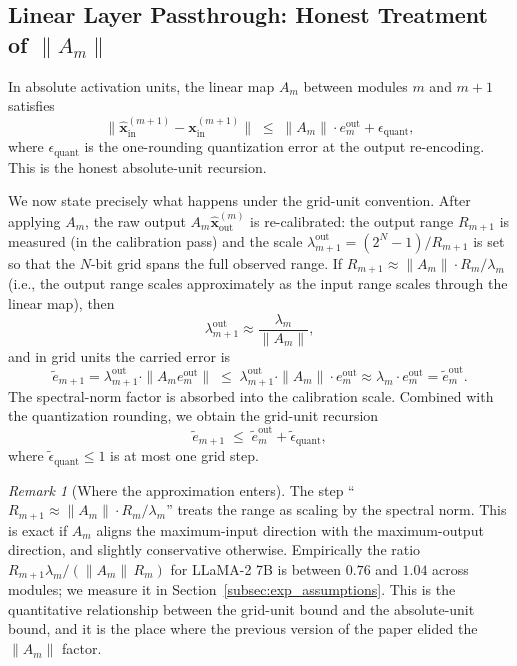 \documentclass{article}
\theoremstyle{plain}
\theoremstyle{definition}
\theoremstyle{remark}
\newtheorem{remark}[theorem]{Remark}
\begin{document}
\subsection{Linear Layer Passthrough: Honest Treatment of $\|A_m\|$}
\label{app:linear_passthrough_honest}

In absolute activation units, the linear map $A_m$ between modules $m$ and
$m+1$ satisfies
\begin{equation}
\label{eq:linear_passthrough_abs}
\|\hat{\mathbf{x}}^{(m+1)}_\mathrm{in} - \mathbf{x}^{(m+1)}_\mathrm{in}\|
\;\le\; \|A_m\| \cdot e_m^\mathrm{out} + \epsilon_\mathrm{quant},
\end{equation}
where $\epsilon_\mathrm{quant}$ is the one-rounding quantization error at the
output re-encoding. This is the honest absolute-unit recursion.

We now state precisely what happens under the grid-unit convention. After
applying $A_m$, the raw output $A_m \hat{\mathbf{x}}^{(m)}_\mathrm{out}$ is
re-calibrated: the output range $R_{m+1}$ is measured (in the calibration
pass) and the scale $\lambda_{m+1}^{\mathrm{out}} = (2^N-1)/R_{m+1}$ is set so
that the $N$-bit grid spans the full observed range. If $R_{m+1} \approx
\|A_m\| \cdot R_m / \lambda_m$ (i.e., the output range scales approximately
as the input range scales through the linear map), then
\[
\lambda_{m+1}^{\mathrm{out}} \approx \frac{\lambda_m}{\|A_m\|},
\]
and in grid units the carried error is
\[
\tilde{e}_{m+1}
= \lambda_{m+1}^{\mathrm{out}} \cdot \|A_m e_m^\mathrm{out}\|
\;\le\; \lambda_{m+1}^{\mathrm{out}} \cdot \|A_m\| \cdot e_m^\mathrm{out}
\approx \lambda_m \cdot e_m^\mathrm{out}
= \tilde e_m^\mathrm{out}.
\]
The spectral-norm factor is absorbed into the calibration scale.
Combined with the quantization rounding, we obtain the grid-unit recursion
\begin{equation}
\label{eq:linear_passthrough_grid}
\tilde{e}_{m+1} \;\le\; \tilde{e}_m^\mathrm{out} + \tilde\epsilon_\mathrm{quant},
\end{equation}
where $\tilde\epsilon_\mathrm{quant} \le 1$ is at most one grid step.

\begin{remark}[Where the approximation enters]
\label{rem:abs_approx}
The step ``$R_{m+1} \approx \|A_m\| \cdot R_m / \lambda_m$'' treats the range
as scaling by the spectral norm. This is exact if $A_m$ aligns the
maximum-input direction with the maximum-output direction, and slightly
conservative otherwise. Empirically the ratio
$R_{m+1}\lambda_m / (\|A_m\|\,R_m)$ for LLaMA-2 7B is between $0.76$ and
$1.04$ across modules; we measure it in Section~\ref{subsec:exp_assumptions}.
This is the quantitative relationship between the grid-unit bound and the
absolute-unit bound, and it is the place where the previous version of the
paper elided the $\|A_m\|$ factor.
\end{remark}
\end{document}
